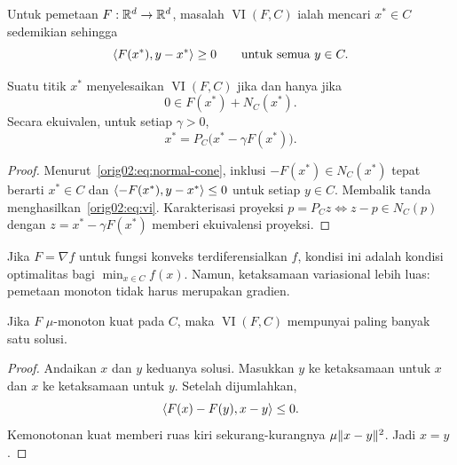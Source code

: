 \begin{defn}
  \label{orig02:def:vi}
  Untuk pemetaan $F:\mathbb{R}^d\to\mathbb{R}^d$, masalah $\operatorname{VI}(F,C)$ ialah
  mencari $x^*\in C$ sedemikian sehingga
  \begin{equation}
    \label{orig02:eq:vi}
    \left\langle F(x^*) , y-x^*\right\rangle\geq0
    \qquad\text{untuk semua }y\in C.
  \end{equation}
\end{defn}

\begin{prop}
  \label{orig02:prop:vi-inclusion}
  Suatu titik $x^*$ menyelesaikan $\operatorname{VI}(F,C)$ jika dan hanya jika
  \begin{equation}
    \label{orig02:eq:vi-inclusion}
    0\in F(x^*)+N_C(x^*).
  \end{equation}
  Secara ekuivalen, untuk setiap $\gamma>0$,
  \begin{equation}
    \label{orig02:eq:vi-projection}
    x^*=P_C\bigl(x^*-\gamma F(x^*)\bigr).
  \end{equation}
\end{prop}
\begin{proof}
  Menurut~\eqref{orig02:eq:normal-cone}, inklusi
  $-F(x^*)\in N_C(x^*)$ tepat berarti $x^*\in C$ dan
  $\left\langle-F(x^*) , y-x^*\right\rangle\leq0$ untuk setiap $y\in C$. Membalik tanda
  menghasilkan~\eqref{orig02:eq:vi}. Karakterisasi proyeksi
  $p=P_Cz\Longleftrightarrow z-p\in N_C(p)$ dengan
  $z=x^*-\gamma F(x^*)$ memberi ekuivalensi proyeksi.
\end{proof}

Jika $F=\nabla f$ untuk fungsi konveks terdiferensialkan $f$, kondisi ini
adalah kondisi optimalitas bagi $\min_{x\in C}f(x)$. Namun, ketaksamaan
variasional lebih luas: pemetaan monoton tidak harus merupakan gradien.

\begin{prop}
  \label{orig02:prop:vi-unique}
  Jika $F$ $\mu$-monoton kuat pada $C$, maka
  $\operatorname{VI}(F,C)$ mempunyai paling banyak satu solusi.
\end{prop}
\begin{proof}
  Andaikan $x$ dan $y$ keduanya solusi. Masukkan $y$ ke ketaksamaan untuk
  $x$ dan $x$ ke ketaksamaan untuk $y$. Setelah dijumlahkan,
  \begin{equation}
    \left\langle F(x)-F(y) , x-y\right\rangle\leq0.
  \end{equation}
  Kemonotonan kuat memberi ruas kiri sekurang-kurangnya
  $\mu\|x-y\|^2$. Jadi $x=y$.
\end{proof}

